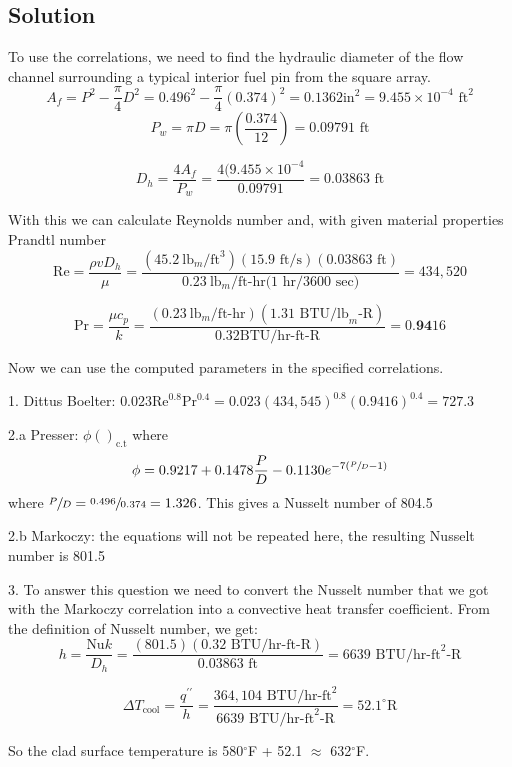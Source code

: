 \begin{fullwidth}
\subsection{Solution}
To use the correlations, we need to find the hydraulic diameter of the flow channel surrounding a typical interior fuel pin from the square array.
\begin{equation*}
A_f = P^2 - \frac{\pi}{4}D^2 = 0.496^2 - \frac{\pi}{4}(0.374)^2 = 0.1362 \text{in}^2 = 9.455 \times 10^{-4} \text{ ft}^2
\end{equation*}
\begin{equation*}
P_w = \pi D = \pi \left(\frac{0.374}{12} \right) = 0.09791 \text{ ft}
\end{equation*}

\begin{equation*}
D_h = \frac{4 A_f}{P_w} = \frac{4 (9.455 \times 10^{-4}}{0.09791} = 0.03863 \text{ ft}
\end{equation*}

With this we can calculate Reynolds number and, with given material properties Prandtl number
\begin{equation*}
\text{Re} = \frac{\rho v D_h}{\mu} = \frac{(45.2\  \text{lb}_m/\text{ft}^3)(15.9 \text{ ft/s})(0.03863 \text{ ft})}{0.23 \ \text{lb}_m\text{/ft-hr} \text{(1 hr/3600 sec)}} = 434,520
\end{equation*}

\begin{equation*}
\text{Pr} = \frac{\mu c_p}{k}= \frac{(0.23 \ \text{lb}_m\text{/ft-hr})(1.31 \text{ BTU/lb}_m\text{-R})}{0.32 \text{BTU/hr-ft-R}} = 0.\textbf{94}16
\end{equation*}

Now we can use the computed parameters in the specified correlations.

1. Dittus Boelter: $0.023 \text{Re}^{0.8}\text{Pr}^{0.4} = 0.023(434,545)^{0.8}(0.9416)^{0.4} = 727.3$

2.a Presser: $\phi\left( \right)_{\text{c.t}}$ where
$$ \phi = 0.9217 + 0.1478 \frac{P}{D} - 0.1130 e^{-7 \left(\sfrac{P}{D}-1 \right)}$$
where $\sfrac{P}{D} = \sfrac{0.496}{0.374} = 1.326$.  This gives a Nusselt number of 804.5

2.b Markoczy: the equations will not be repeated here, the resulting Nusselt number is 801.5

3. To answer this question we need to convert the Nusselt number that we got with the Markoczy correlation into a convective heat transfer coefficient.  From the definition of Nusselt number, we get:
$$h = \frac{\text{Nu} k}{D_h} = \frac{(801.5) (0.32 \text{ BTU/hr-ft-R})}{0.03863 \text{ ft}} = 6639 \text{ BTU/hr-ft}^{2}\text{-R}$$

$$\Delta T_{\text{cool}} = \frac{q^{\prime \prime}}{h} = \frac{364,104 \text{ BTU/hr-ft}^2}{6639 \text{ BTU/hr-ft}^{2}\text{-R}} =  52.1^{\circ}\text{R}$$

So the clad surface temperature is 580$^{\circ}$F + 52.1 $\approx$ 632$^{\circ}$F.
 

\end{fullwidth}

